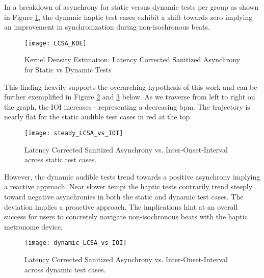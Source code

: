 In a breakdown of asynchrony for static versus dynamic tests per group as shown in Figure \ref{fig:LCSA_KDE}, the dynamic haptic test cases exhibit a shift towards zero implying an improvement in synchronization during non-isochronous beats.   
\begin{figure}[H]
    \centering
    \texttt{[image: LCSA\_KDE]}
    \caption{Kernel Density Estimation: Latency Corrected Sanitized Asynchrony for Static vs Dynamic Tests}
    \label{fig:LCSA_KDE}
\end{figure}This finding heavily supports the overarching hypothesis of this work and can be further exemplified in Figure \ref{fig:sLCSAvIOI} and \ref{fig:dLCSAvIOI} below. As we traverse from left to right on the graph, the IOI increases - representing a decreasing bpm. The trajectory is nearly flat for the static audible test cases in red at the top. 
\begin{figure}[H]
    \centering
    \texttt{[image: steady\_LCSA\_vs\_IOI]}
    \caption{Latency Corrected Sanitized Asynchrony vs. Inter-Onset-Interval across static test cases.}
    \label{fig:sLCSAvIOI}
\end{figure}
However, the dynamic audible tests trend towards a positive asynchrony implying a reactive approach. Near slower tempi the haptic tests contrarily trend steeply toward negative asynchronies in both the static and dynamic test cases. The deviation implies a proactive approach. The implications hint at an overall success for users to concretely navigate non-isochronous beats with the haptic metronome device. 
\begin{figure}[H]
    \centering
    \texttt{[image: dynamic\_LCSA\_vs\_IOI]}
    \caption{Latency Corrected Sanitized Asynchrony vs. Inter-Onset-Interval across dynamic test cases.}
    \label{fig:dLCSAvIOI}
\end{figure}

